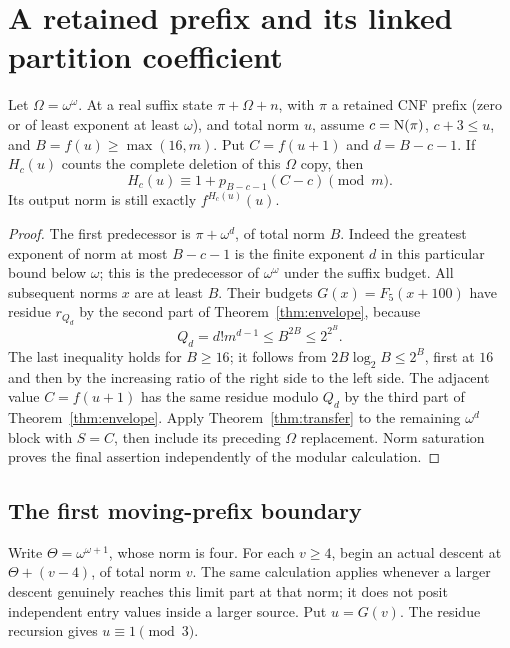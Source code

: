 \section{A retained prefix and its linked partition coefficient}
\label{sec:boundary}

\begin{proposition}\label{prop:omega-block}
Let $\Omega=\omega^\omega$. At a real suffix state $\pi+\Omega+n$, with $\pi$ a retained CNF
prefix (zero or of least exponent at least $\omega$), and total norm $u$,
assume $c=\operatorname{N}(\pi)$, $c+3\le u$, and
$B=f(u)\ge\max(16,m)$. Put $C=f(u+1)$ and $d=B-c-1$.
If $H_c(u)$ counts the complete deletion of this $\Omega$ copy,
then
\begin{equation}\label{eq:omega-block}
 H_c(u)\equiv1+p_{B-c-1}(C-c)\pmod m.
\end{equation}
Its output norm is still exactly $f^{H_c(u)}(u)$.
\end{proposition}
\begin{proof}
The first predecessor is $\pi+\omega^d$, of total norm $B$.
Indeed the greatest exponent of norm at most $B-c-1$ is the
finite exponent $d$ in this particular bound below $\omega$;
this is the predecessor of $\omega^\omega$ under the suffix budget.
All subsequent norms $x$ are at least $B$. Their budgets
$G(x)=F_5(x+100)$ have residue $r_{Q_d}$ by the second part of
Theorem~\ref{thm:envelope}, because
\[
 Q_d=d!m^{d-1}\le B^{2B}\le2^{2^B}.
\]
The last inequality holds for $B\ge16$; it follows from
$2B\log_2 B\le2^B$, first at $16$ and then by the increasing
ratio of the right side to the left side.
The adjacent value $C=f(u+1)$ has the same residue modulo $Q_d$
by the third part of Theorem~\ref{thm:envelope}.
Apply Theorem~\ref{thm:transfer} to the remaining $\omega^d$ block
with $S=C$, then include its preceding $\Omega$ replacement.
Norm saturation proves the final assertion independently of the
modular calculation.
\end{proof}

\subsection{The first moving-prefix boundary}

Write $\Theta=\omega^{\omega+1}$, whose norm is four.
For each $v\ge4$, begin an actual descent at $\Theta+(v-4)$,
of total norm $v$. The same calculation applies whenever a larger
descent genuinely reaches this limit part at that norm; it does not
posit independent entry values inside a larger source.
Put $u=G(v)$. The residue recursion gives $u\equiv1\pmod3$.


